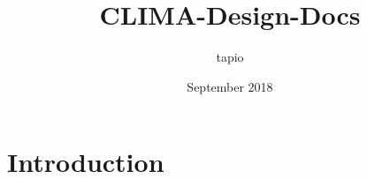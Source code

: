\documentclass{article}
\title{CLIMA-Design-Docs}
\author{tapio }
\date{September 2018}
\begin{document}
\maketitle

\section{Introduction}
\end{document}

